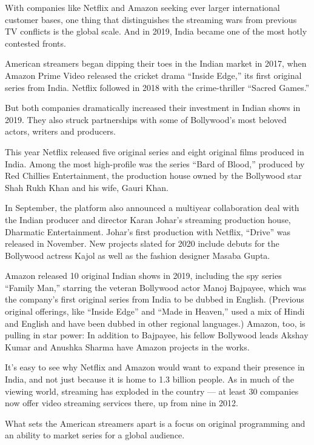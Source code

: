 With companies like Netflix and Amazon seeking ever larger international
customer bases, one thing that distinguishes the streaming wars from
previous TV conflicts is the global scale. And in 2019, India became one
of the most hotly contested fronts.

American streamers began dipping their toes in the Indian market in
2017, when Amazon Prime Video released the cricket drama ``Inside
Edge,'' its first original series from India. Netflix followed in 2018
with the crime-thriller ``Sacred Games.''

But both companies dramatically increased their investment in Indian
shows in 2019. They also struck partnerships with some of Bollywood's
most beloved actors, writers and producers.

This year Netflix released five original series and eight original films
produced in India. Among the most high-profile was the series ``Bard of
Blood,'' produced by Red Chillies Entertainment, the production house
owned by the Bollywood star Shah Rukh Khan and his wife, Gauri Khan.

In September, the platform also announced a multiyear collaboration deal
with the Indian producer and director Karan Johar's streaming production
house, Dharmatic Entertainment. Johar's first production with Netflix,
``Drive'' was released in November. New projects slated for 2020 include
debuts for the Bollywood actress Kajol as well as the fashion designer
Masaba Gupta.

Amazon released 10 original Indian shows in 2019, including the spy
series ``Family Man,'' starring the veteran Bollywood actor Manoj
Bajpayee, which was the company's first original series from India to be
dubbed in English. (Previous original offerings, like ``Inside Edge''
and ``Made in Heaven,'' used a mix of Hindi and English and have been
dubbed in other regional languages.) Amazon, too, is pulling in star
power: In addition to Bajpayee, his fellow Bollywood leads Akshay Kumar
and Anushka Sharma have Amazon projects in the works.

It's easy to see why Netflix and Amazon would want to expand their
presence in India, and not just because it is home to 1.3 billion
people. As in much of the viewing world, streaming has exploded in the
country --- at least 30 companies now offer video streaming services
there, up from nine in 2012.

What sets the American streamers apart is a focus on original
programming and an ability to market series for a global audience.

